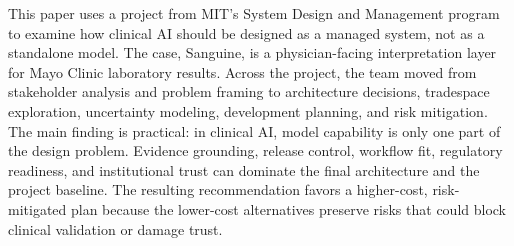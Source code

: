 This paper uses a project from MIT's System Design and Management program to examine how clinical AI should be designed as a managed system, not as a standalone model. The case, Sanguine, is a physician-facing interpretation layer for Mayo Clinic laboratory results. Across the project, the team moved from stakeholder analysis and problem framing to architecture decisions, tradespace exploration, uncertainty modeling, development planning, and risk mitigation. The main finding is practical: in clinical AI, model capability is only one part of the design problem. Evidence grounding, release control, workflow fit, regulatory readiness, and institutional trust can dominate the final architecture and the project baseline. The resulting recommendation favors a higher-cost, risk-mitigated plan because the lower-cost alternatives preserve risks that could block clinical validation or damage trust.
